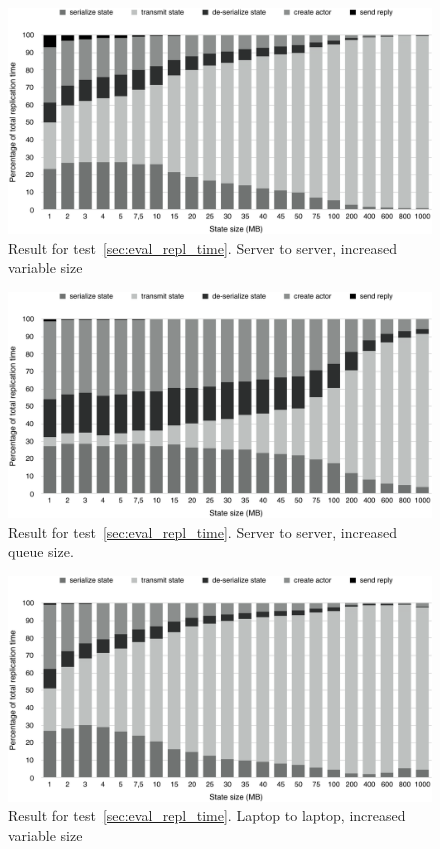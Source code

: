 \documentclass{cslthse-msc}
\begin{document}
\begin{figure}[hbt!]
\centering
\includegraphics[scale=0.5]{images/results/replication_time/server_parts_variable.pdf} 
\caption{Result for test~\ref{sec:eval_repl_time}. Server to server, increased variable size} \label{fig:replication_time_parts_server_variable}
\end{figure}

\begin{figure}[hbt!]
\centering
\includegraphics[scale=0.5]{images/results/replication_time/server_parts_queue.pdf} 
\caption{Result for test~\ref{sec:eval_repl_time}. Server to server, increased queue size.} \label{fig:replication_time_parts_server_queue}
\end{figure}

\begin{figure}[hbt!]
\centering
\includegraphics[scale=0.5]{images/results/replication_time/laptop_parts_variable.pdf} 
\caption{Result for test~\ref{sec:eval_repl_time}. Laptop to laptop, increased variable size} \label{fig:replication_time_parts_laptop_variable}
\end{figure}
\end{document}
